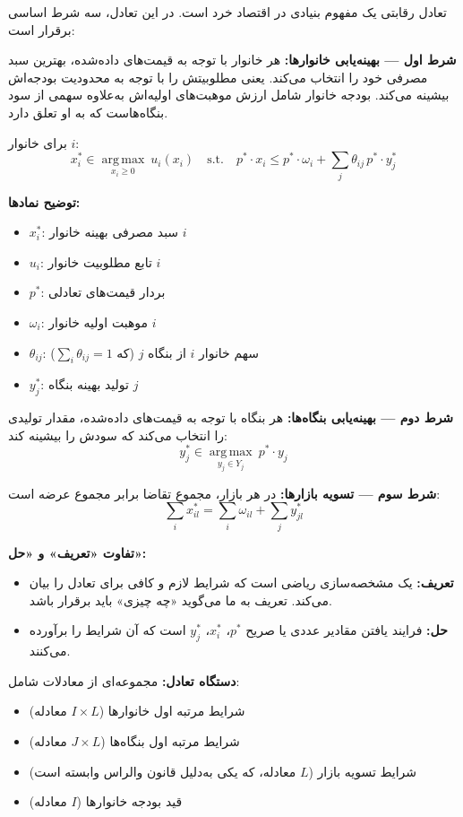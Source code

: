 \documentclass[12pt,a4paper]{article}
\newcommand{\argmax}{\operatorname*{arg\,max}}
\begin{document}
تعادل رقابتی یک مفهوم بنیادی در اقتصاد خرد است. در این تعادل، سه شرط اساسی برقرار است:

\textbf{شرط اول — بهینه‌یابی خانوارها:} هر خانوار با توجه به قیمت‌های داده‌شده، بهترین سبد مصرفی خود را انتخاب می‌کند. یعنی مطلوبیتش را با توجه به محدودیت بودجه‌اش بیشینه می‌کند. بودجه خانوار شامل ارزش موهبت‌های اولیه‌اش به‌علاوه سهمی از سود بنگاه‌هاست که به او تعلق دارد.

برای خانوار $i$:
\[
	x_i^* \in \argmax_{x_i \geq 0} \ u_i(x_i)
	\quad \text{s.t.} \quad
	p^* \cdot x_i \leq p^* \cdot \omega_i + \sum_{j} \theta_{ij} \, p^* \cdot y_j^*
\]

\textbf{توضیح نمادها:}
\begin{itemize}
	\item $x_i^*$: سبد مصرفی بهینه خانوار $i$
	\item $u_i$: تابع مطلوبیت خانوار $i$
	\item $p^*$: بردار قیمت‌های تعادلی
	\item $\omega_i$: موهبت اولیه خانوار $i$
	\item $\theta_{ij}$: سهم خانوار $i$ از بنگاه $j$ (که $\sum_i \theta_{ij} = 1$)
	\item $y_j^*$: تولید بهینه بنگاه $j$
\end{itemize}

\textbf{شرط دوم — بهینه‌یابی بنگاه‌ها:} هر بنگاه با توجه به قیمت‌های داده‌شده، مقدار تولیدی را انتخاب می‌کند که سودش را بیشینه کند:
\[
	y_j^* \in \argmax_{y_j \in Y_j} \ p^* \cdot y_j
\]

\textbf{شرط سوم — تسویه بازارها:} در هر بازار، مجموع تقاضا برابر مجموع عرضه است:
\[
	\sum_{i} x_{il}^* = \sum_{i} \omega_{il} + \sum_{j} y_{jl}^*
\]

\textbf{تفاوت «تعریف» و «حل»:}

\begin{itemize}
	\item \textbf{تعریف:} یک مشخصه‌سازی ریاضی است که شرایط لازم و کافی برای تعادل را بیان می‌کند. تعریف به ما می‌گوید «چه چیزی» باید برقرار باشد.
	\item \textbf{حل:} فرایند یافتن مقادیر عددی یا صریح $p^*$، $x_i^*$، $y_j^*$ است که آن شرایط را برآورده می‌کنند.
\end{itemize}

\textbf{دستگاه تعادل:} مجموعه‌ای از معادلات شامل:
\begin{itemize}
	\item شرایط مرتبه اول خانوارها ($I \times L$ معادله)
	\item شرایط مرتبه اول بنگاه‌ها ($J \times L$ معادله)
	\item شرایط تسویه بازار ($L$ معادله، که یکی به‌دلیل قانون والراس وابسته است)
	\item قید بودجه خانوارها ($I$ معادله)
\end{itemize}
\end{document}
